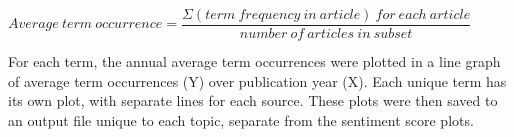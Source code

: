 \documentclass{report}
\begin{document}
\begin{center}
	$Average \ term \ occurrence = \dfrac{\Sigma (term \ frequency \ in \ article) \ for \ each \ article}{number \ of \ articles \ in \ subset}$
\end{center}

For each term, the annual average term occurrences were plotted in a line graph of average term occurrences (Y) over publication year (X).
Each unique term has its own plot, with separate lines for each source. 
These plots were then saved to an output file unique to each topic, separate from the sentiment score plots.





\end{document}
